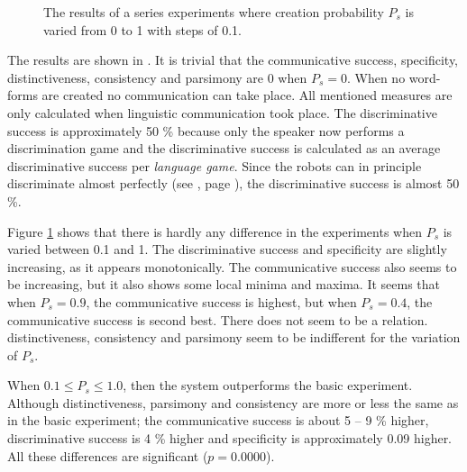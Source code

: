 \begin{figure}
\caption{The results of a series experiments where creation probability $P_s$ is varied from 0 to 1 with steps of 0.1.}
\label{f:lex:p}
\end{figure}

The results are shown in . It is trivial that the communicative success, specificity, distinctiveness, consistency and parsimony are 0 when $P_s=0$. When no word-forms are created no communication can take place. All mentioned measures are only calculated when linguistic communication took place. The discriminative success is approximately 50 \% because only the speaker now performs a discrimination game and the discriminative success is calculated as an average discriminative success per {\em language game}. Since the robots can in principle discriminate almost perfectly (see , page \pageref{f:st:ds}), the discriminative success is almost 50 \%. 

Figure \ref{f:lex:p} shows that there is hardly any difference in the experiments when $P_s$ is varied between 0.1 and 1. The discriminative success and specificity are slightly increasing, as it appears monotonically. The communicative success also seems to be increasing, but it also shows some local minima and maxima. It seems that when $P_s=0.9$, the communicative success is highest, but when $P_s=0.4$, the communicative success is second best. There does not seem to be a relation. distinctiveness, consistency and parsimony seem to be indifferent for the variation of $P_s$.

When $0.1 \leq P_s \leq 1.0$, then the system outperforms the basic experiment. Although distinctiveness, parsimony and consistency are more or less the same as in the basic experiment; the communicative success is about 5 -- 9 \% higher, discriminative success is 4 \% higher and specificity is approximately 0.09 higher. All these differences are significant ($p=0.0000$).

